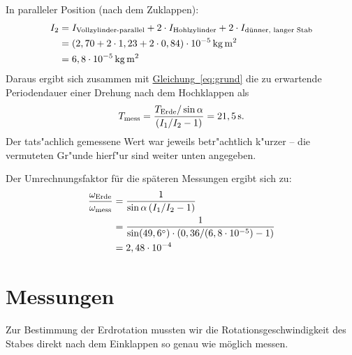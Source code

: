 \documentclass[halfparskip, 11pt]{scrartcl}
\newcommand{\unit}[1]{\ensuremath{\,\mathrm{#1}}} %
\newcommand{\degr}{\ensuremath{^\circ}}
\newcommand{\ee}[1]{\ensuremath{\cdot 10^{#1}}}
\newcommand{\ltext}[1]{\ensuremath{_{\textnormal{#1}}}}
\newcommand{\hypref}[2]{\hyperref[#2]{{#1}~\ref{#2}}}
\begin{document}
In paralleler Position (nach dem Zuklappen):
\begin{align}
I_2
&= I\ltext{Vollzylinder-parallel}+2 \cdot I\ltext{Hohlzylinder} + 2 \cdot I\ltext{dünner, langer Stab}\nonumber\\
&= (2,70 + 2\cdot1,23 + 2\cdot0,84)\ee{-5}\unit{kg\,m^2}\nonumber\\
&= 6,8 \ee{-5} \unit{kg\,m^2}
\end{align}
Daraus ergibt sich zusammen mit \hypref{Gleichung}{eq:grund} die zu erwartende Periodendauer einer Drehung nach dem Hochklappen als
\begin{equation}
\label{eq:tpara}
T\ltext{mess}
=\frac{T\ltext{Erde} / \sin\alpha}{\left(I_1/I_2-1\right)}
= 21,5 \unit{s}.
\end{equation}
Der tats"achlich gemessene Wert war jeweils betr"achtlich k"urzer -- die vermuteten Gr"unde hierf"ur sind weiter unten angegeben.

Der Umrechnungsfaktor für die späteren Messungen ergibt sich zu:
\begin{align}
\frac{\omega\ltext{Erde}}{\omega\ltext{mess}}
&= \frac{1}{\sin\alpha\,(I_1 / I_2 - 1)}\nonumber\\
&= \frac{1}{\sin(49,6\degr)\cdot(0,36 / (6,8\ee{-5}) - 1)}\nonumber\\
&= 2,48\ee{-4}
\end{align}




\section{Messungen}
Zur Bestimmung der Erdrotation mussten wir die Rotationsgeschwindigkeit des Stabes direkt nach dem Einklappen so genau wie möglich messen.
\end{document}
